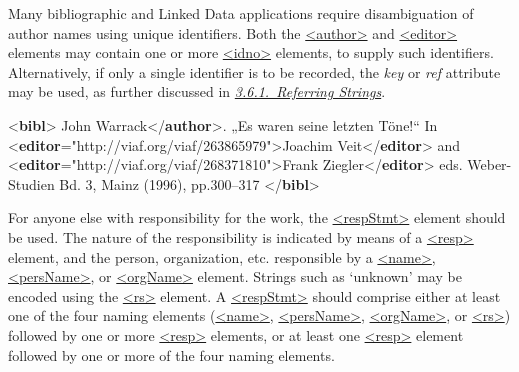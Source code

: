 Many bibliographic and Linked Data applications require disambiguation of author names using unique identifiers. Both the \hyperref[TEI.author]{<author>} and \hyperref[TEI.editor]{<editor>} elements may contain one or more \hyperref[TEI.idno]{<idno>} elements, to supply such identifiers. Alternatively, if only a single identifier is to be recorded, the {\itshape key} or {\itshape ref} attribute may be used, as further discussed in \textit{\hyperref[CONARS]{3.6.1.\ Referring Strings}}.\par\bgroup{}\exampleFont \begin{shaded}\noindent\mbox{}{<\textbf{bibl}>}\mbox{}\newline 
{}John Warrack{</\textbf{author}>}. „Es waren seine letzten Töne!“\mbox{}\newline 
 In {<\textbf{editor}\hspace*{1em}{ref}="{http://viaf.org/viaf/263865979}">}Joachim Veit{</\textbf{editor}>} \mbox{}\newline 
 and {<\textbf{editor}\hspace*{1em}{ref}="{http://viaf.org/viaf/268371810}">}Frank Ziegler{</\textbf{editor}>} eds. Weber-Studien Bd. 3, Mainz (1996), pp.300–317\mbox{}\newline 
\mbox{}\newline 
{</\textbf{bibl}>}\end{shaded}\egroup\par \par
For anyone else with responsibility for the work, the \hyperref[TEI.respStmt]{<respStmt>} element should be used. The nature of the responsibility is indicated by means of a \hyperref[TEI.resp]{<resp>} element, and the person, organization, etc. responsible by a \hyperref[TEI.name]{<name>}, \hyperref[TEI.persName]{<persName>}, or \hyperref[TEI.orgName]{<orgName>} element. Strings such as ‘unknown’ may be encoded using the \hyperref[TEI.rs]{<rs>} element. A \hyperref[TEI.respStmt]{<respStmt>} should comprise either at least one of the four naming elements (\hyperref[TEI.name]{<name>}, \hyperref[TEI.persName]{<persName>}, \hyperref[TEI.orgName]{<orgName>}, or \hyperref[TEI.rs]{<rs>}) followed by one or more \hyperref[TEI.resp]{<resp>} elements, or at least one \hyperref[TEI.resp]{<resp>} element followed by one or more of the four naming elements.\par
